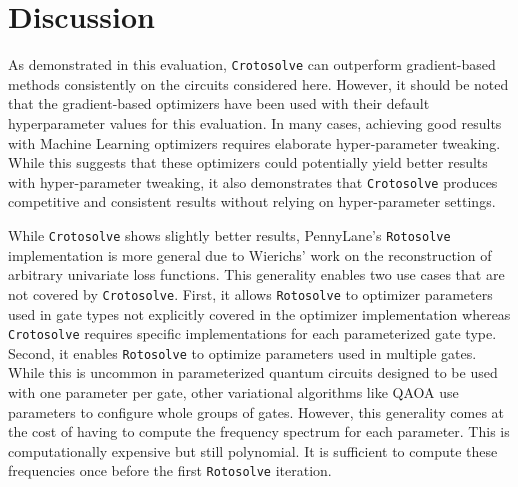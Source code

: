 \section{Discussion}
\label{sec:evaluation-discussion}

As demonstrated in this evaluation, \texttt{Crotosolve} can outperform
gradient-based methods consistently on the circuits considered here.
However, it should be noted that the gradient-based optimizers have been used
with their default hyperparameter values for this evaluation.
In many cases, achieving good results with Machine Learning optimizers requires
elaborate hyper-parameter tweaking.
While this suggests that these optimizers could potentially yield better results
with hyper-parameter tweaking, it also demonstrates that \texttt{Crotosolve}
produces competitive and consistent results without relying on hyper-parameter
settings.

While \texttt{Crotosolve} shows slightly better results, PennyLane's
\texttt{Rotosolve} implementation is more general due to Wierichs' work on the
reconstruction of arbitrary univariate loss functions.
This generality enables two use cases that are not covered by \texttt{Crotosolve}.
First, it allows \texttt{Rotosolve} to optimizer parameters used in gate types
not explicitly covered in the optimizer implementation whereas
\texttt{Crotosolve} requires specific implementations for each parameterized
gate type.
Second, it enables \texttt{Rotosolve} to optimize parameters used in multiple
gates.
While this is uncommon in parameterized quantum circuits designed to be used
with one parameter per gate, other variational algorithms like QAOA use
parameters to configure whole groups of gates.
However, this generality comes at the cost of having to compute the frequency
spectrum for each parameter.
This is computationally expensive but still polynomial.
It is sufficient to compute these frequencies once before the first
\texttt{Rotosolve} iteration.
